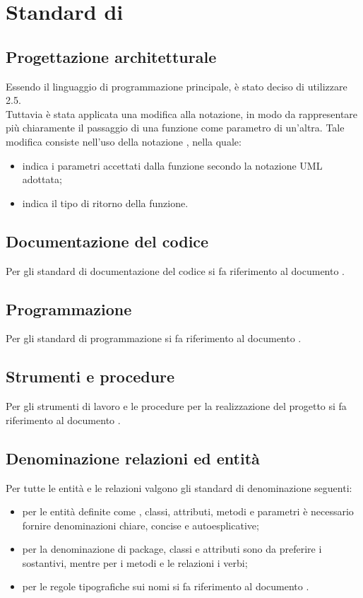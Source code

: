 \section{Standard di }
\subsection{Progettazione architetturale}
Essendo  il linguaggio di programmazione principale, è stato 
deciso di utilizzare  2.5. \\
Tuttavia è stata applicata una modifica alla notazione, in modo da rappresentare più chiaramente il passaggio di una funzione come parametro di un'altra.
Tale modifica consiste nell’uso della notazione , nella quale:
\begin{itemize}
	\item {} indica i parametri accettati dalla funzione secondo la notazione UML adottata;
	\item {} indica il tipo di ritorno della funzione.
\end{itemize}
\subsection{Documentazione del codice}
Per gli standard di documentazione del codice si fa riferimento al documento \NPdoc.
\subsection{Programmazione}
Per gli standard di programmazione si fa riferimento al documento \NPdoc.
\subsection{Strumenti e procedure}
Per gli strumenti di lavoro e le procedure per la realizzazione del progetto si fa riferimento al documento \NPdoc.
\subsection{Denominazione relazioni ed entità}
Per tutte le entità e le relazioni valgono gli standard di denominazione seguenti:
\begin{itemize}
	\item per le entità definite come , classi, attributi, metodi e parametri è necessario fornire denominazioni chiare, concise e autoesplicative;
	\item per la denominazione di package, classi e attributi sono da preferire i sostantivi, mentre per i metodi e le relazioni i verbi;
	\item per le regole tipografiche sui nomi si fa riferimento al documento \NPdoc.
\end{itemize}